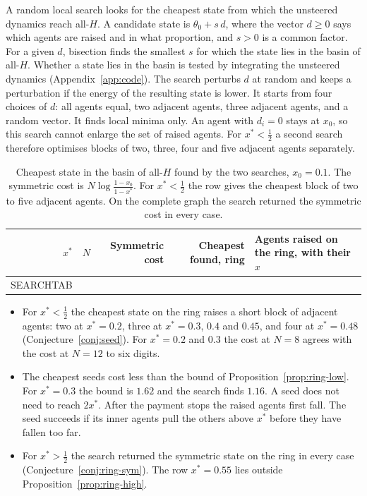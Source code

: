 \documentclass[11pt,a4paper]{article}
\theoremstyle{definition}
\theoremstyle{plain}
\newcommand{\xs}{x^{*}}
\begin{document}
A random local search looks for the cheapest state from which the unsteered dynamics reach all-$H$. A candidate state is $\theta_0+s\,d$, where the vector $d\ge0$ says which agents are raised and in what proportion, and $s>0$ is a common factor. For a given $d$, bisection finds the smallest $s$ for which the state lies in the basin of all-$H$. Whether a state lies in the basin is tested by integrating the unsteered dynamics (Appendix~\ref{app:code}). The search perturbs $d$ at random and keeps a perturbation if the energy of the resulting state is lower. It starts from four choices of $d$: all agents equal, two adjacent agents, three adjacent agents, and a random vector. It finds local minima only. An agent with $d_i=0$ stays at $x_0$, so this search cannot enlarge the set of raised agents. For $\xs<\tfrac12$ a second search therefore optimises blocks of two, three, four and five adjacent agents separately.

\begin{table}[H]
\centering\small
\begin{tabular}{rrrrl}
\toprule
$\xs$ & $N$ & Symmetric cost & Cheapest found, ring & Agents raised on the ring, with their $x$\\
\midrule
SEARCHTAB
\bottomrule
\end{tabular}
\caption{Cheapest state in the basin of all-$H$ found by the two searches, $x_0=0.1$. The symmetric cost is $N\log\frac{1-x_0}{1-\xs}$. For $\xs<\tfrac12$ the row gives the cheapest block of two to five adjacent agents. On the complete graph the search returned the symmetric cost in every case.}\label{tab:search}
\end{table}

\begin{itemize}
\item For $\xs<\tfrac12$ the cheapest state on the ring raises a short block of adjacent agents: two at $\xs=0.2$, three at $\xs=0.3$, $0.4$ and $0.45$, and four at $\xs=0.48$ (Conjecture~\ref{conj:seed}). For $\xs=0.2$ and $0.3$ the cost at $N=8$ agrees with the cost at $N=12$ to six digits.
\item The cheapest seeds cost less than the bound of Proposition~\ref{prop:ring-low}. For $\xs=0.3$ the bound is $1.62$ and the search finds $1.16$. A seed does not need to reach $2\xs$. After the payment stops the raised agents first fall. The seed succeeds if its inner agents pull the others above $\xs$ before they have fallen too far.
\item For $\xs>\tfrac12$ the search returned the symmetric state on the ring in every case (Conjecture~\ref{conj:ring-sym}). The row $\xs=0.55$ lies outside Proposition~\ref{prop:ring-high}.
\end{itemize}
\end{document}
